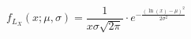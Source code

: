 








\begin{equation}
{\displaystyle f_{L_X}(x;\mu ,\sigma )={\frac {1}{x\sigma {\sqrt {2\pi }}}}\cdot e^ {-\frac {\left(\ln(x)-\mu \right)^{2}}{2\sigma ^{2}}}}
\label{eq:Lognormal}
\end{equation}




